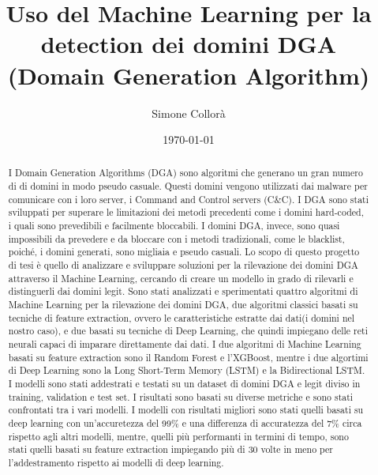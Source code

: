 \documentclass[12pt,a4paper,openright,twoside]{book}
\title{Uso del Machine Learning per la detection dei domini DGA \break (Domain Generation Algorithm)}
\author{Simone Collorà}
\date{\today}
\begin{document}
\frontmatter\frontispiece
\nocite{*}

\begin{abstract}	
I Domain Generation Algorithms (DGA) sono algoritmi che generano un gran numero di
di domini in modo pseudo casuale.
Questi domini vengono utilizzati dai malware per comunicare con i loro server,
i Command and Control servers (C\&C).
I DGA sono stati sviluppati per superare le limitazioni
dei metodi precedenti come i domini hard-coded, i quali
sono prevedibili e facilmente bloccabili.
I domini DGA, invece, sono quasi impossibili da prevedere e da bloccare con i metodi tradizionali,
come le blacklist,
poiché, i domini generati, sono migliaia e pseudo casuali.
Lo scopo di questo progetto di tesi è quello di analizzare
e sviluppare soluzioni per la rilevazione dei domini DGA attraverso il Machine Learning, cercando
di creare un modello in grado di rilevarli e distinguerli
dai domini legit.
Sono stati analizzati e sperimentati quattro algoritmi di Machine Learning
per la rilevazione dei domini DGA, due algoritmi classici 
basati su tecniche di feature extraction, ovvero le caratteristiche estratte dai dati(i domini nel nostro caso),
e due basati su tecniche di Deep Learning, che quindi impiegano delle
reti neurali capaci di imparare direttamente dai dati.
I due algoritmi di Machine Learning basati su feature extraction
sono il Random Forest e l'XGBoost, mentre i due algortimi
di Deep Learning sono la Long Short-Term Memory (LSTM) e la Bidirectional LSTM.
I modelli sono stati addestrati e testati su un dataset di domini
DGA e legit diviso in training, validation e test set.
I risultati sono basati su diverse metriche e
sono stati confrontati tra i vari modelli.
I modelli con risultati migliori sono stati
quelli basati su deep learning con un'accuretezza del 99\% e una differenza di accuratezza del 7\%
circa rispetto agli altri modelli,
mentre, quelli più performanti in termini di tempo,
sono stati quelli basati su feature extraction
impiegando più di 30 volte in meno per l'addestramento rispetto ai modelli di deep learning.
\end{abstract}



\tableofcontents   
\listoffigures     %

\mainmatter
\end{document}
